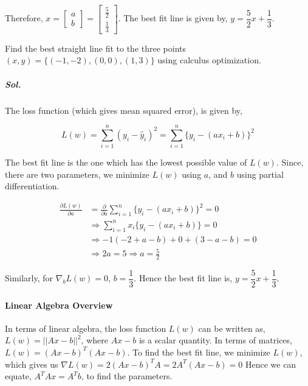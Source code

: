 \documentclass{article}
\newcounter{example}
\begin{document}
        Therefore, \(x=\begin{bmatrix}
            a\\
            b
        \end{bmatrix}=\begin{bmatrix}
            \frac52\\
            \frac13
        \end{bmatrix}\). The best fit line is given by, \(y=\dfrac52x+\dfrac13\).

        \pagebreak

        \begin{example}
            Find the best straight line fit to the three points \((x,y)=\{(-1,-2),(0,0),(1,3)\}\) using calculus optimization.
        \end{example}

        \subparagraph{Sol.}

        The loss function (which gives mean squared error), is given by,
        
        \[L(w)=\displaystyle{\sum_{i=1}^{n}(y_i-\hat y_i)^2=\sum_{i=1}^{n}\{y_i-(ax_i+b)\}^2}\]

        The best fit line is the one which has the lowest possible value of \(L(w)\). Since, there are two parameters, we minimize \(L(w)\) using \(a\), and \(b\) using partial differentiation.

        \begin{align*}
            \frac{\partial L(w)}{\partial a}&=\frac{\partial}{\partial a}\sum_{i=1}^n{\{y_i-(ax_i+b)\}^2}=0\\
            &\Rightarrow \sum_{i=1}^nx_i\{y_i-(ax_i+b)\}=0\\
            &\Rightarrow -1(-2+a-b)+0+(3-a-b)=0\\
            &\Rightarrow 2a=5\Rightarrow a=\frac{5}{2}
        \end{align*}

        Similarly, for \(\nabla_b L(w)=0\), \(b=\dfrac13\). Hence the best fit line is, \(y=\dfrac52x+\dfrac13\).

        \paragraph{Linear Algebra Overview}

        In terms of linear algebra, the loss function \(L(w)\) can be written as, \(L(w)=||Ax-b||^2\), where \(Ax-b\) is a scalar quantity. In terms of matrices, \(L(w)=(Ax-b)^T(Ax-b)\). To find the best fit line, we minimize \(L(w)\), which gives us \(\nabla L(w)=2(Ax-b)^TA=2A^T(Ax-b)=0\) Hence we can equate, \(A^TAx=A^Tb\), to find the parameters.
\end{document}
